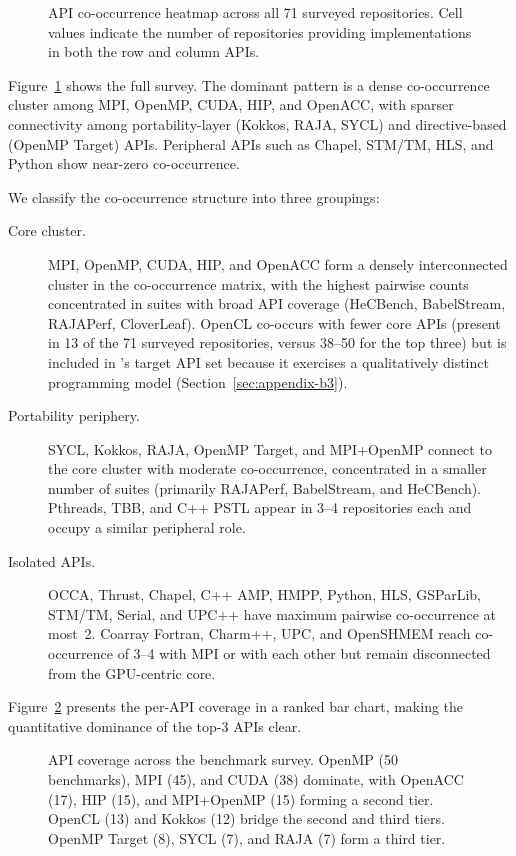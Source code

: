 \begin{figure}[htbp]
\centering

\caption{API co-occurrence heatmap across all 71 surveyed repositories. Cell values indicate the number of repositories providing implementations in both the row and column APIs.}
\label{fig:api-heatmap}
\end{figure}

Figure~\ref{fig:api-heatmap} shows the full survey. The dominant pattern is a dense co-occurrence cluster among MPI, OpenMP, CUDA, HIP, and OpenACC, with sparser connectivity among portability-layer (Kokkos, RAJA, SYCL) and directive-based (OpenMP Target) APIs. Peripheral APIs such as Chapel, STM/TM, HLS, and Python show near-zero co-occurrence.

We classify the co-occurrence structure into three groupings:
\begin{description}
\item[Core cluster.] MPI, OpenMP, CUDA, HIP, and OpenACC form a densely interconnected cluster in the co-occurrence matrix, with the highest pairwise counts concentrated in suites with broad API coverage (HeCBench, BabelStream, RAJAPerf, CloverLeaf). OpenCL co-occurs with fewer core APIs (present in 13 of the 71 surveyed repositories, versus 38--50 for the top three) but is included in \parbench{}'s target API set because it exercises a qualitatively distinct programming model (Section~\ref{sec:appendix-b3}).
\item[Portability periphery.] SYCL, Kokkos, RAJA, OpenMP Target, and MPI+OpenMP connect to the core cluster with moderate co-occurrence, concentrated in a smaller number of suites (primarily RAJAPerf, BabelStream, and HeCBench). Pthreads, TBB, and C++ PSTL appear in 3--4 repositories each and occupy a similar peripheral role.
\item[Isolated APIs.] OCCA, Thrust, Chapel, C++ AMP, HMPP, Python, HLS, GSParLib, STM/TM, Serial, and UPC++ have maximum pairwise co-occurrence at most~2. Coarray Fortran, Charm++, UPC, and OpenSHMEM reach co-occurrence of 3--4 with MPI or with each other but remain disconnected from the GPU-centric core.
\end{description}

Figure~\ref{fig:api-coverage} presents the per-API coverage in a ranked bar chart, making the quantitative dominance of the top-3 APIs clear.

\begin{figure}[htbp]
    \centering
    
    \caption{API coverage across the benchmark survey. OpenMP (50 benchmarks), MPI (45), and CUDA (38) dominate, with OpenACC (17), HIP (15), and MPI+OpenMP (15) forming a second tier. OpenCL (13) and Kokkos (12) bridge the second and third tiers. OpenMP Target (8), SYCL (7), and RAJA (7) form a third tier.}
    \label{fig:api-coverage}
\end{figure}

